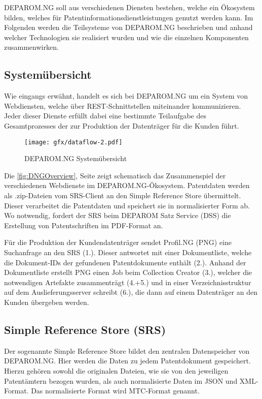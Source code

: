 DEPAROM.NG soll aus verschiedenen Diensten bestehen, welche ein Ökosystem
bilden, welches für Patentinformationsdienstleistungen genutzt werden kann. Im
Folgenden werden die Teilsysteme von DEPAROM.NG  beschrieben und anhand welcher
Technologien sie realisiert wurden und wie die einzelnen Komponenten
zusammenwirken.

\subsection{Systemübersicht}
\label{ch:fachlichesUmfeld:Teilsysteme:Uebersicht}

Wie eingangs erwähnt, handelt es sich bei DEPAROM.NG um ein System von
Webdiensten, welche  über REST-Schnittstellen miteinander kommunizieren. Jeder
dieser Dienste erfüllt dabei eine bestimmte Teilaufgabe des Gesamtprozesses der
zur Produktion der Datenträger für die Kunden führt.

\begin{figure}[h]
  \texttt{[image: gfx/dataflow-2.pdf]}
  \caption{DEPAROM.NG Systemübersicht}
  \label{fig:DNGOverview}
\end{figure}

Die \autoref{fig:DNGOverview}, Seite \pageref{fig:DNGOverview} zeigt schematisch
das Zusammenspiel der verschiedenen Webdienste im DEPAROM.NG-Ökosystem.
Patentdaten werden als .zip-Dateien vom SRS-Client an den Simple Reference Store
übermittelt. Dieser verarbeitet die Patentdaten und speichert sie in
normalisierter Form ab. Wo notwendig, fordert der SRS beim DEPAROM Satz Service
(DSS) die Erstellung von Patentschriften im PDF-Format an.

Für die Produktion der Kundendatenträger sendet Profil.NG (PNG) eine Suchanfrage
an den SRS (1.). Dieser antwortet mit einer Dokumentliste, welche die
Dokument-IDs der gefundenen Patentdokumente enthält (2.). Anhand der
Dokumentliste erstellt PNG einen Job beim Collection Creator (3.), welcher die
notwendigen Artefakte zusammenträgt (4.+5.) und in einer Verzeichnisstruktur auf
dem Auslieferungsserver schreibt (6.), die dann auf einem Datenträger an den
Kunden übergeben werden.

\subsection{Simple Reference Store (SRS)}
\label{ch:fachlichesUmfeld:Teilsysteme:SRS}

Der sogenannte Simple Reference Store bildet den zentralen Datenspeicher von
DEPAROM.NG. Hier werden die Daten zu jedem Patentdokument gespeichert. Hierzu
gehören sowohl die originalen Dateien, wie sie von den jeweiligen Patentämtern
bezogen wurden, als auch normalisierte Daten im JSON und XML-Format. Das
normalisierte Format wird MTC-Format genannt.

